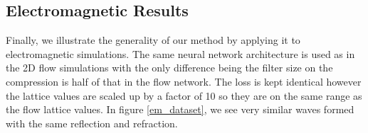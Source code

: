 \documentclass{article}
\begin{document}




\subsection{Electromagnetic Results}

Finally, we illustrate the generality of our method by applying it to electromagnetic simulations. The same neural network architecture is used as in the 2D flow simulations with the only difference being the filter size on the compression is half of that in the flow network. The loss is kept identical however the lattice values are scaled up by a factor of 10 so they are on the same range as the flow lattice values. In figure \ref{em_dataset}, we see very similar waves formed with the same reflection and refraction.
\end{document}
